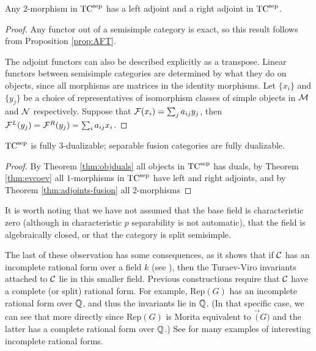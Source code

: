 \documentclass{amsart}
\begin{document}
\begin{theorem} \label{thm:adjoints-fusion}
Any $2$-morphism in ${\mathrm{TC}^{\text{sep}}}$ has a left adjoint and a right adjoint in ${\mathrm{TC}^{\text{sep}}}$.
\end{theorem}
\begin{proof}
Any functor out of a semisimple category is exact, so this result follows from Proposition \ref{prop:AFT}.

The adjoint functors can also be described explicitly as a transpose.  Linear functors between semisimple categories are determined by what they do on objects, since all morphisms are matrices in the identity morphisms.  Let $\{x_i\}$ and $\{y_j\}$ be a choice of representatives of isomorphism classes of simple objects in $\mathcal M$ and $\mathcal N$ respectively.  Suppose that $\mathcal F(x_i) = \sum_j a_{ij} y_j$, then $\mathcal F^L(y_j) = \mathcal F^R(y_j) = \sum_i a_{ij} x_i$. 
\end{proof}

\begin{theorem}  \label{thm:TC-dualizable}
 ${\mathrm{TC}^{\text{sep}}}$ is fully 3-dualizable; separable fusion categories are fully dualizable.
\end{theorem}
\begin{proof}
By Theorem \ref{thm:objduals} all objects in ${\mathrm{TC}^{\text{sep}}}$ has duals, by Theorem \ref{thm:evcoev} all $1$-morphisms in ${\mathrm{TC}^{\text{sep}}}$ have left and right adjoints, and by Theorem \ref{thm:adjoints-fusion} all $2$-morphisms  
\end{proof}


\begin{remark}
It is worth noting that we have not assumed that the base field is characteristic zero (although in characteristic $p$ separability is not automatic), that the field is algebraically closed, or that the category is split semisimple.  

The last of these observation has some consequences, as it shows that if $\mathcal C$ has an incomplete rational form over a field $k$ (see \cite{1002.0168}), then the Turaev-Viro invariants attached to $\mathcal C$ lie in this smaller field.  Previous constructions require that $\mathcal C$ have a complete (or split) rational form.  For example, $\mathrm{Rep}(G)$ has an incomplete rational form over $\mathbb Q$, and thus the invariants lie in $\mathbb Q$.  (In that specific case, we can see that more directly since $\mathrm{Rep}(G)$ is Morita equivalent to $\Vec(G)$ and the latter has a complete rational form over $\mathbb Q$.)  See \cite{1102.0657} for many examples of interesting incomplete rational forms.
\end{remark}
\end{document}
